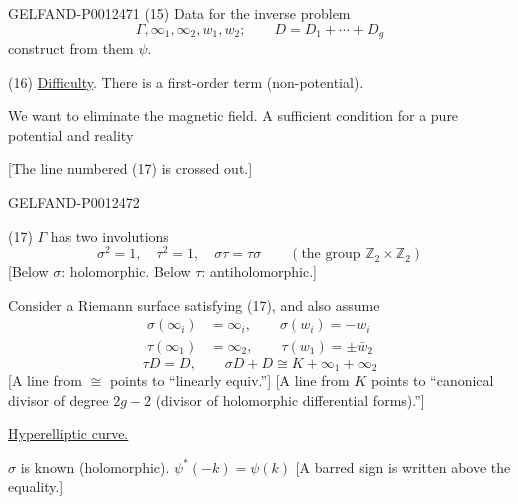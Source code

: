 \begin{GelfandAdjacentEvidence}{GELFAND-P001247}{1}
(15) Data for the inverse problem
\begin{equation*}
\Gamma,\infty_1,\infty_2,w_1,w_2;\qquad D=D_1+\cdots+D_g
\end{equation*}
construct from them $\psi$.

(16) \underline{Difficulty}. There is a first-order term (non-potential).

We want to eliminate the magnetic field. A sufficient condition for a pure potential and reality

[The line numbered (17) is crossed out.]
\end{GelfandAdjacentEvidence}
\begin{GelfandAdjacentEvidence}{GELFAND-P001247}{2}


(17) $\Gamma$ has two involutions
\begin{equation*}
\sigma^2=1,\quad\tau^2=1,\quad\sigma\tau=\tau\sigma
\qquad(\text{the group }\mathbb Z_2\times\mathbb Z_2)
\end{equation*}
[Below $\sigma$: holomorphic. Below $\tau$: antiholomorphic.]

Consider a Riemann surface satisfying (17), and also assume
\begin{equation*}
\begin{aligned}
\sigma(\infty_i)&=\infty_i,\qquad\sigma(w_i)=-w_i\\
\tau(\infty_1)&=\infty_2,\qquad\tau(w_1)=\pm\bar w_2
\end{aligned}\tag{18}
\end{equation*}
\begin{equation*}
\tau D=D,\qquad\sigma D+D\cong K+\infty_1+\infty_2\tag{19}
\end{equation*}
[A line from $\cong$ points to “linearly equiv.”]
[A line from $K$ points to “canonical divisor of degree $2g-2$ (divisor of holomorphic differential forms).”]

\underline{Hyperelliptic curve.}

$\sigma$ is known (holomorphic). $\psi^*(-k)=\psi(k)$ [A barred sign is written above the equality.]
\end{GelfandAdjacentEvidence}
